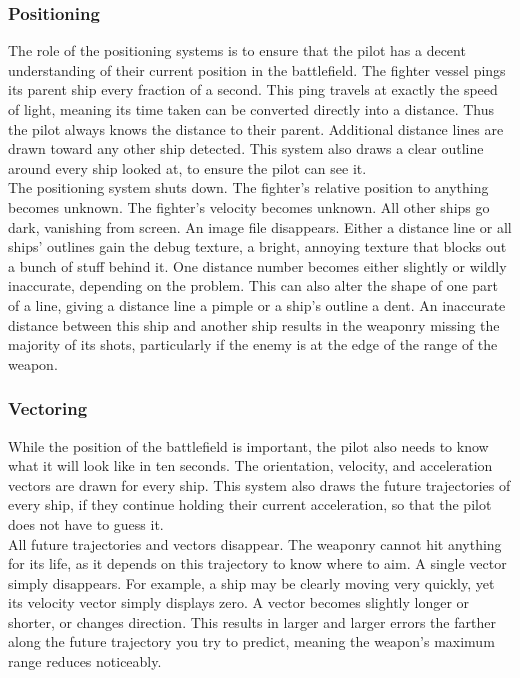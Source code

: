 \documentclass[a4paper]{article}
\begin{document}
\hspace{-18pt} \subsubsection{Positioning} \label{fighter_positioning} \vspace{-0.2cm}
The role of the positioning systems is to ensure that the pilot has a decent understanding of their current position in the battlefield. The fighter vessel pings its parent ship every fraction of a second. This ping travels at exactly the speed of light, meaning its time taken can be converted directly into a distance. Thus the pilot always knows the distance to their parent. Additional distance lines are drawn toward any other ship detected. This system also draws a clear outline around every ship looked at, to ensure the pilot can see it.
\\ \cci
{The positioning system shuts down. The fighter's relative position to anything becomes unknown. The fighter's velocity becomes unknown. All other ships go dark, vanishing from screen.}
{An image file disappears. Either a distance line or all ships' outlines gain the debug texture, a bright, annoying texture that blocks out a bunch of stuff behind it.}
{One distance number becomes either slightly or wildly inaccurate, depending on the problem. This can also alter the shape of one part of a line, giving a distance line a pimple or a ship's outline a dent. An inaccurate distance between this ship and another ship results in the weaponry missing the majority of its shots, particularly if the enemy is at the edge of the range of the weapon.}

\vspace{-0.5cm} \hspace{-18pt} \subsubsection{Vectoring} \label{fighter_vectoring} \vspace{-0.2cm}
While the position of the battlefield is important, the pilot also needs to know what it will look like in ten seconds. The orientation, velocity, and acceleration vectors are drawn for every ship. This system also draws the future trajectories of every ship, if they continue holding their current acceleration, so that the pilot does not have to guess it.
\\ \cci
{All future trajectories and vectors disappear. The weaponry cannot hit anything for its life, as it depends on this trajectory to know where to aim.}
{A single vector simply disappears. For example, a ship may be clearly moving very quickly, yet its velocity vector simply displays zero.}
{A vector becomes slightly longer or shorter, or changes direction. This results in larger and larger errors the farther along the future trajectory you try to predict, meaning the weapon's maximum range reduces noticeably.}
\end{document}
